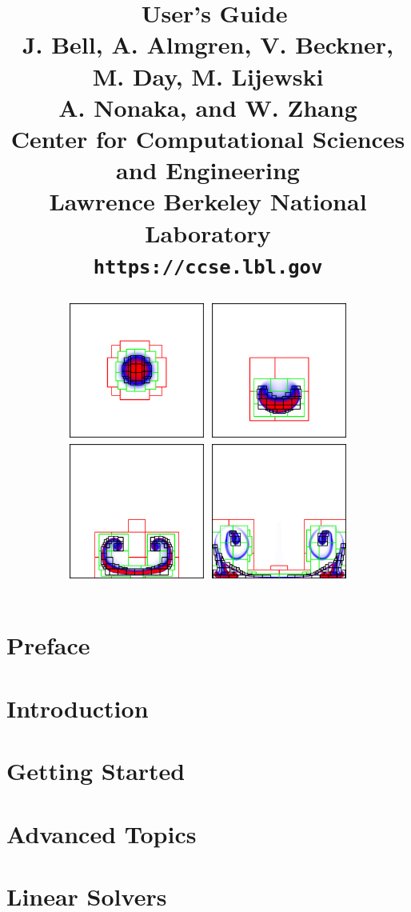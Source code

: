 \documentclass[11pt]{book}
\title{\Huge{\bf \FBoxLib\ User's Guide}\\
       \vspace{0.5in}
       \Large{J. Bell, A. Almgren, V. Beckner, M. Day, M. Lijewski}\\
       \Large{A. Nonaka, and W. Zhang}\\
\vspace{0.25in}
       \Large{Center for Computational Sciences and Engineering}\\
       \Large{Lawrence Berkeley National Laboratory}\\
       \Large{\tt https://ccse.lbl.gov}
\begin{figure}[b]
\centering
\includegraphics[width=1.75in]{./Introduction/varden1}
\includegraphics[width=1.75in]{./Introduction/varden2}\\
\includegraphics[width=1.75in]{./Introduction/varden3}
\includegraphics[width=1.75in]{./Introduction/varden4}
\end{figure}
}
\makeatletter
\renewcommand*\cleardoublepage{\clearpage\if@twoside
\ifodd\c@page\else
\hbox{}
\thispagestyle{empty}
\newpage
\if@twocolumn\hbox{}\newpage\fi\fi\fi}
\makeatother
\begin{document}
\frontmatter

\maketitle

\cleardoublepage

\setcounter{tocdepth}{1}
\tableofcontents

\cleardoublepage


\cleardoublepage

\chapter*{Preface}


\mainmatter

\chapter{Introduction}\label{Chap:Introduction}


\chapter{Getting Started}\label{Chap:Getting Started}


\chapter{Advanced Topics}\label{Chap:Advanced Topics F}


\chapter{Linear Solvers}\label{Chap:Linear Solvers}

\end{document}
